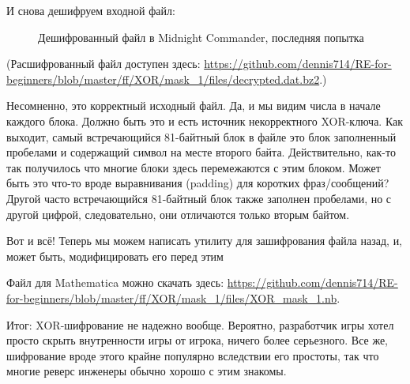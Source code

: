 И снова дешифруем входной файл:

\begin{figure}[H]
\centering
{}
\caption{Дешифрованный файл в Midnight Commander, последняя попытка}
\end{figure}

(Расшифрованный файл доступен здесь:
\url{https://github.com/dennis714/RE-for-beginners/blob/master/ff/XOR/mask_1/files/decrypted.dat.bz2}.)

Несомненно, это корректный исходный файл.
Да, и мы видим числа в начале каждого блока. Должно быть это и есть источник некорректного XOR-ключа.
Как выходит, самый встречающийся 81-байтный блок в файле это блок заполненный пробелами и содержащий символ  на месте
второго байта.
Действительно, как-то так получилось что многие блоки здесь перемежаются с этим блоком.
Может быть это что-то вроде выравнивания (padding) для коротких фраз/сообщений?
Другой часто встречающийся 81-байтный блок также заполнен пробелами, но с другой цифрой, следовательно,
они отличаются только вторым байтом.

Вот и всё! Теперь мы можем написать утилиту для зашифрования файла назад, и, может быть, модифицировать его перед этим

Файл для Mathematica можно скачать здесь:
\url{https://github.com/dennis714/RE-for-beginners/blob/master/ff/XOR/mask_1/files/XOR_mask_1.nb}.

Итог: XOR-шифрование не надежно вообще. Вероятно, разработчик игры хотел просто скрыть внутренности игры от игрока,
ничего более серьезного.
Все же, шифрование вроде этого крайне популярно вследствии его простоты, так что многие реверс инженеры обычно хорошо
с этим знакомы.

